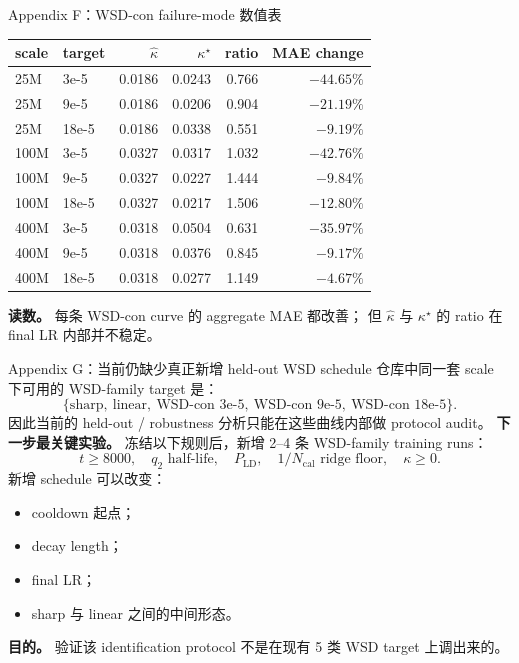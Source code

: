 \documentclass[9pt,aspectratio=169,fontset=fandol]{ctexbeamer}
\newcommand{\tightlist}{\setlength{\itemsep}{2pt}\setlength{\parskip}{0pt}}
\begin{document}
\begin{frame}{Appendix F：WSD-con failure-mode 数值表}
\scriptsize
\begin{center}
\begin{tabular}{llrrrr}
\toprule
scale & target & \(\widehat\kappa\) & \(\kappa^\star\) & ratio & MAE change\\
\midrule
25M & 3e-5 & 0.0186 & 0.0243 & 0.766 & \(-44.65\%\)\\
25M & 9e-5 & 0.0186 & 0.0206 & 0.904 & \(-21.19\%\)\\
25M & 18e-5 & 0.0186 & 0.0338 & 0.551 & \(-9.19\%\)\\
100M & 3e-5 & 0.0327 & 0.0317 & 1.032 & \(-42.76\%\)\\
100M & 9e-5 & 0.0327 & 0.0227 & 1.444 & \(-9.84\%\)\\
100M & 18e-5 & 0.0327 & 0.0217 & 1.506 & \(-12.80\%\)\\
400M & 3e-5 & 0.0318 & 0.0504 & 0.631 & \(-35.97\%\)\\
400M & 9e-5 & 0.0318 & 0.0376 & 0.845 & \(-9.17\%\)\\
400M & 18e-5 & 0.0318 & 0.0277 & 1.149 & \(-4.67\%\)\\
\bottomrule
\end{tabular}
\end{center}
\vfill
\small
\textbf{读数。}
每条 WSD-con curve 的 aggregate MAE 都改善；
但 \(\widehat\kappa\) 与 \(\kappa^\star\) 的 ratio 在 final LR 内部并不稳定。
\end{frame}

\begin{frame}{Appendix G：当前仍缺少真正新增 held-out WSD schedule}
\small
仓库中同一套 scale 下可用的 WSD-family target 是：
\[
\{\text{sharp},\ \text{linear},\ \text{WSD-con 3e-5},\ \text{WSD-con 9e-5},\ \text{WSD-con 18e-5}\}.
\]
因此当前的 held-out / robustness 分析只能在这些曲线内部做 protocol audit。
\vfill
\textbf{下一步最关键实验。}
冻结以下规则后，新增 2--4 条 WSD-family training runs：
\[
t\ge8000,\quad
q_2\text{ half-life},\quad
P_{\mathrm{LD}},\quad
1/N_{\mathrm{cal}}\text{ ridge floor},\quad
\kappa\ge0.
\]
新增 schedule 可以改变：
\begin{itemize}\tightlist
\item cooldown 起点；
\item decay length；
\item final LR；
\item sharp 与 linear 之间的中间形态。
\end{itemize}
\vfill
\textbf{目的。}
验证该 identification protocol 不是在现有 5 类 WSD target 上调出来的。
\end{frame}
\end{document}
